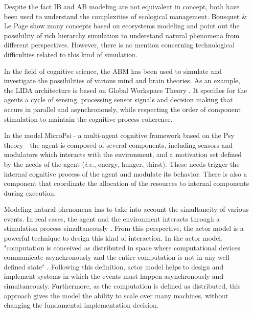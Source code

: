 \documentclass[runningheads]{llncs}
\begin{document}
Despite the fact IB and AB modeling are not equivalent in concept, both have been used to understand the complexities of ecological management. Bousquet \& Le Page\cite{Bousquet2004} show many concepts based on ecosystems modeling and point out the possibility of rich hierarchy simulation to understand natural phenomena from different perspectives. However, there is no mention concerning technological difficulties related to this kind of simulation.

In the field of cognitive science, the ABM has been used to  simulate and investigate the possibilities of various mind and brain theories. As an example, the LIDA architecture is based on Global Workspace Theory \cite{Friedlander2008}. It specifies for the agents a cycle of sensing, processing sensor signals and decision making that occurs in parallel and asynchronously, while respecting the order of component stimulation to maintain the cognitive process coherence.

In the model MicroPsi - a multi-agent cognitive framework based on the Psy theory \cite{Bach2003} \cite{Bach2012} - the agent is composed of several components, including sensors and modulators which interacts with the environment, and a motivation set defined by the needs of the agent (\textit{i.e.},  energy, hunger, thirst). These needs trigger the internal cognitive process of the agent and modulate its behavior. There is also a component that coordinate the allocation of the resources to internal components during execution. 

Modeling natural phenomena has to take into account the simultaneity of various events. In real cases, the agent and the environment interacts through a stimulation process simultaneously \cite{Maturana1987}. From this perspective, the actor model is a powerful technique to design this kind of interaction. In the actor model, "computation  is  conceived  as  distributed  in space where computational devices communicate asynchronously and the entire  computation  is  not  in  any  well-defined  state" \cite{Hewitt2012}. Following this definition, actor model helps to design and implement systems in which the events  must happen asynchronously and simultaneously. Furthermore, as the computation is defined as distributed, this approach gives the model the ability to scale over many machines, without changing the fundamental implementation decision. 
\end{document}

